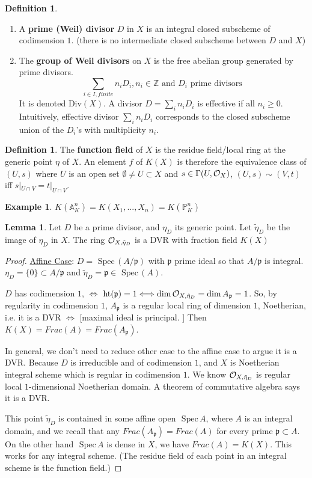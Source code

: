 \documentclass[11pt]{article}
\theoremstyle{definition}
\newtheorem{lemma}[thm]{Lemma}
\newtheorem{dfn}[thm]{Definition}
\newtheorem{ex}[thm]{Example}
\newcommand{\spec}{\text{ Spec}\,}
\newcommand{\affn}{\mathbb A}
\newcommand{\proj}{\mathbb P}
\newcommand{\intg}{\mathbb Z}
\newcommand{\scp}{{\mathfrak p}}
\newcommand{\calo}{{\cal O}}
\newcommand{\Llrta}{\Longleftrightarrow}
\begin{document}
\begin{dfn}
\ \begin{enumerate}[label=(\arabic*)]
\item  A \textbf{prime (Weil) divisor} $D$ in $X$ is an integral closed subscheme of codimension $1$. (there is no intermediate closed subscheme between $D$ and $X$)
\item The \textbf{group of Weil divisors} on $X$ is the free abelian group generated by  prime divisors.
$$
\sum_{i\in I, finite} n_i D_i
, n_i\in \intg\text{ and } D_i \text{ prime divisors }
$$
It is denoted $\text{Div}(X)$. A divisor $D=\sum_i n_i D_i$ is effective if all $n_i\geq 0$. Intuitively, effective divisor $\sum_i n_i D_i$ corresponds to the closed subscheme union of the $D_i$'s with multiplicity $n_i$.
\end{enumerate}
\end{dfn}
\begin{dfn}
The \textbf{function field} of $X$ is the residue field/local ring at the generic point $\eta$ of $X$. An element $f$ of $K(X)$ is therefore the equivalence class of $(U,s)$ where $U$ is 
an open set $\emptyset \neq U\subset X$ and $s\in \Gamma(U,\calo_X)$, $(U,s)\sim (V,t)$ iff $s|_{U\cap V}=t|_{U\cap V}$.
\end{dfn}
\begin{ex}
$K(\affn^n_K)=K(X_1,...,X_n)=K(\proj^n_K)$
\end{ex}
\begin{lemma}
Let $D$ be a prime divisor, and $\eta_D$ its generic point. Let $\tilde{\eta}_D$ be the image of $\eta_D$ in $X$. The ring 
$\calo_{X,\tilde{\eta}_D}$ is a DVR with fraction field $K(X)$
\end{lemma}
\begin{proof}
\underline{Affine Case}: $D=\spec(A/\scp)$ with $\scp$ prime ideal so that $A/\scp$ is integral. $\eta_D=\{0\}\subset A/\scp$ and $\tilde{\eta}_D=\scp\in \spec(A)$.

$D$ has codimension $1$, $\Llrta$ $\text{ht}(\scp)=1\Llrta \dim \calo_{X,\tilde{\eta}_D}=\dim A_\scp=1$. So, by regularity in codimension $1$, $A_\scp$ is a regular local ring of dimension $1$, Noetherian, i.e. it is a DVR $\Llrta $ [maximal ideal is principal. ] Then $K(X)=Frac(A)=Frac(A_\scp)$. 

In general, we don't need to reduce other case to the affine case to argue it is a DVR. Because $D$ is irreducible and of codimension $1$, and $X$ is Noetherian integral scheme which is regular in codimension $1$. We know $\calo_{X,\tilde{\eta}_D}$ is regular local $1$-dimensional Noetherian domain. A theorem of commutative algebra says it is a DVR.

This point $\tilde{\eta}_D$ is contained in some affine open $\spec A$, where $A$ is an integral domain, and we recall that any $Frac(A_\scp)=Frac(A)$ for every prime $\scp \subset A$. On the other hand $\spec A$ is dense in $X$, we have $Frac(A)=K(X)$. This works for any  integral scheme. (The residue field of each point in an integral scheme is the function field.)
\end{proof}
\end{document}
